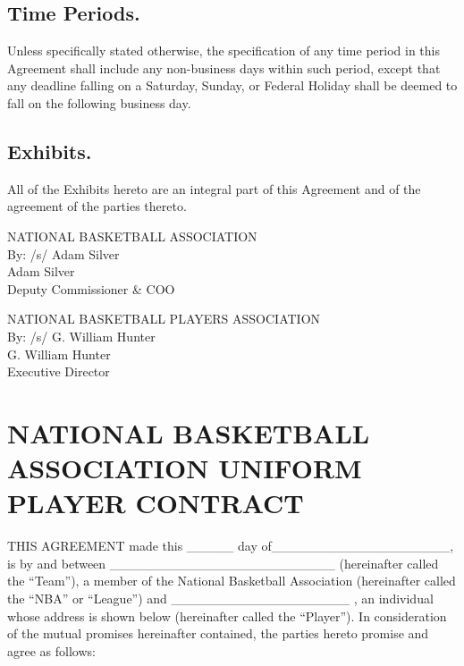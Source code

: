 \documentclass[
]{book}
\begin{document}
\hypertarget{time-periods.}{%
\section{Time Periods.}\label{time-periods.}}

Unless specifically stated otherwise, the specification of any time period in this Agreement shall include any non-business days within such period, except that any deadline falling on a Saturday, Sunday, or Federal Holiday shall be deemed to fall on the following business day.

\hypertarget{exhibits.}{%
\section{Exhibits.}\label{exhibits.}}

All of the Exhibits hereto are an integral part of this Agreement and of the agreement of the parties thereto.

NATIONAL BASKETBALL ASSOCIATION\\
By: /s/ Adam Silver\\
Adam Silver\\
Deputy Commissioner \& COO

NATIONAL BASKETBALL PLAYERS ASSOCIATION\\
By: /s/ G. William Hunter\\
G. William Hunter\\
Executive Director

\hypertarget{appendix-appendix}{%
\appendix}


\hypertarget{national-basketball-association-uniform-player-contract}{%
\chapter{NATIONAL BASKETBALL ASSOCIATION UNIFORM PLAYER CONTRACT}\label{national-basketball-association-uniform-player-contract}}

THIS AGREEMENT made this \_\_\_\_\_ day of\_\_\_\_\_\_\_\_\_\_\_\_\_\_\_\_\_\_\_, is by and between \_\_\_\_\_\_\_\_\_\_\_\_\_\_\_\_\_\_\_\_\_\_\_\_ (hereinafter called the ``Team''), a member of the National Basketball Association (hereinafter called the ``NBA'' or ``League'') and \_\_\_\_\_\_\_\_\_\_\_\_\_\_\_\_\_\_\_ , an individual whose address is shown below (hereinafter called the ``Player''). In consideration of the mutual promises hereinafter contained, the parties hereto promise and agree as follows:
\end{document}
